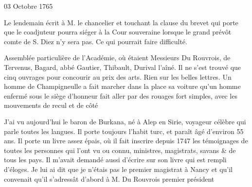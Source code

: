                      \begin{diary}{03 Octobre 1765}{}

                         Le lendemain écrit à M. le chancelier et
                           touchant la clause du brevet qui porte
                           que le coadjuteur pourra siéger à la
                              Cour
                              souveraine lorsque le grand prévôt comte de
                              S. Diez n'y sera pas. Ce qui pourrait
                           faire difficulté. \bigskip


                         Assemblée particulière de l'Académie,
                           où étaient Messieurs
                           Du Rouvrois, de Tervenus, Bagard,
                              abbé Gautier, Thibault, Durival l'aîné.
                           Il ne s'est trouvé que cinq ouvrages pour
                           concourir au prix des arts. Rien sur les
                           belles lettres. Un homme de Champigneulle
                           a fait marcher dans la place sa voiture
                           qu'un homme enfermé sous le siège d'honneur
                           fait aller par des rouages fort simples,
                           avec les mouvements de recul et de côté \bigskip


                         J'ai vu aujourd'hui le baron de Burkana,
                           né à Alep en Sirie, voyageur
                           célèbre qui parle
                           toutes les langues. Il porte toujours l'habit turc,
                           et paraît âgé d'environ 55 ans. Il porte
                           un livre assez épais, où il fait inscrire depuis
                              1747 les témoignages de toutes les personnes qui
                           l'ont vu ou connu, ministres, magistrats,
                           savans \& de tous les pays. Il m'avait demandé
                           aussi d'écrire sur son livre qui est rempli
                           d'éloges. Je lui ai dit que je n'étais pas le premier
                           magistrat à Nancy et qu'il
                           convenait qu'il
                           s'adressât d'abord à M. Du
                              Rouvrois
                           premier président
                        \bigskip


                     \end{diary}

